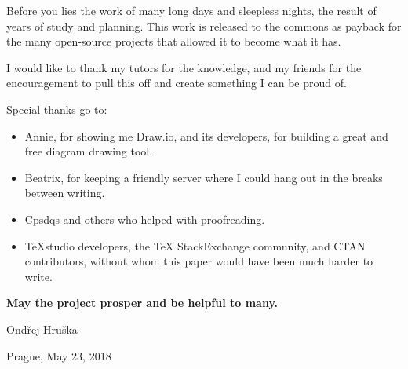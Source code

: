 \begin{thanks}

Before you lies the work of many long days and sleepless nights, the result of years of study and planning. This work is released to the commons as payback for the many open-source projects that allowed it to become what it has.

\vspace{5pt}
I would like to thank my tutors for the knowledge, and my friends for the encouragement to pull this off and create something I can be proud of. 

\vspace{15pt}
\noindent
Special thanks go to:

\vspace{-5pt}
\begin{itemize}
\item Annie, for showing me Draw.io, and its developers, for building a great and free diagram drawing tool.
\item Beatrix, for keeping a friendly server where I could hang out in the breaks between writing.
\item Cpsdqs and others who helped with proofreading.
\item TeXstudio developers, the TeX StackExchange community, and CTAN contributors, without whom this paper would have been much harder to write.
\end{itemize}

\vspace{5pt}
\noindent
\textbf{May the project prosper and be helpful to many.}

\vspace{25pt}
\noindent
Ondřej Hruška

\noindent
Prague, May 23, 2018

\end{thanks}
